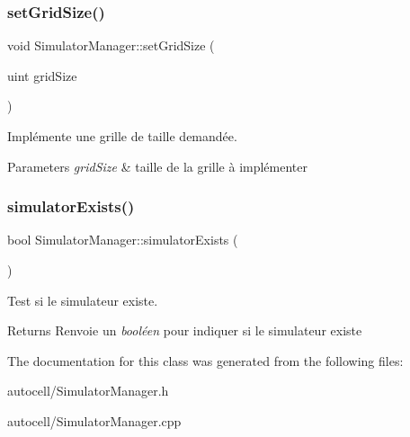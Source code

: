 \subsubsection{\texorpdfstring{set\+Grid\+Size()}{setGridSize()}}
{\footnotesize\ttfamily void Simulator\+Manager\+::set\+Grid\+Size (\begin{DoxyParamCaption}\item[{uint}]{grid\+Size }\end{DoxyParamCaption})}



Implémente une grille de taille demandée. 


\begin{DoxyParams}{Parameters}
{\em grid\+Size} & taille de la grille à implémenter \\
\hline
\end{DoxyParams}
\mbox{\label{class_simulator_manager_ae76186f657172c36ce5b820432e05350}} 
\subsubsection{\texorpdfstring{simulator\+Exists()}{simulatorExists()}}
{\footnotesize\ttfamily bool Simulator\+Manager\+::simulator\+Exists (\begin{DoxyParamCaption}{ }\end{DoxyParamCaption})}



Test si le simulateur existe. 

\begin{DoxyReturn}{Returns}
Renvoie un {\itshape booléen} pour indiquer si le simulateur existe 
\end{DoxyReturn}


The documentation for this class was generated from the following files\+:\begin{DoxyCompactItemize}
\item 
autocell/Simulator\+Manager.\+h\item 
autocell/Simulator\+Manager.\+cpp\end{DoxyCompactItemize}
